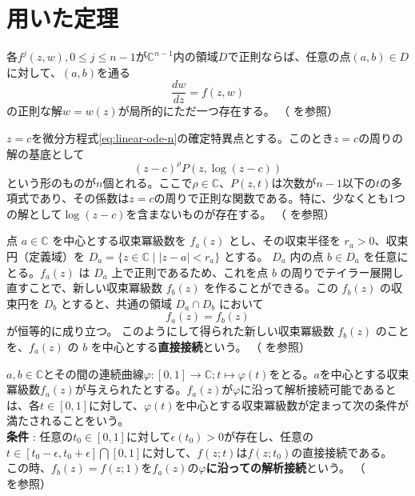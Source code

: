 
\section{用いた定理}%
\begin{theorem}[正則な解の存在と一意性]\label{thm:cauchy}
    各$f^{j}(z,w),0\leq j\leq n-1$が$\mathbb{C}^{n-1}$内の領域$D$で正則ならば、任意の点$(a,b)\in D$に対して、$(a,b)$を通る
    \begin{equation}\label{eq:cauchy_problem}
    \frac{dw}{dz}=f(z,w)
    \end{equation}
    の正則な解$w=w(z)$が局所的にただ一つ存在する。
    （\cite[p.50 定理8.1]{book:takano} を参照）
\end{theorem}
\begin{theorem}\label{thm:fuchs}
    $z=c$を微分方程式\eqref{eq:linear-ode-n}の確定特異点とする。このとき$z=c$の周りの解の基底として
    \[
    (z-c)^{\rho}P(z,\log(z-c))
    \]
    という形のものが$n$個とれる。ここで$\rho\in \mathbb{C}$、$P(z,t)$は次数が$n-1$以下の$t$の多項式であり、その係数は$z=c$の周りで正則な関数である。特に、少なくとも1つの解として$\log(z-c)$を含まないものが存在する。
    （\cite[p.119 定理13.1]{book:takano} を参照）
\end{theorem}
\begin{definition}[直接接続]
    点 $a \in \mathbb{C}$ を中心とする収束冪級数を $f_a(z)$ とし、その収束半径を $r_a > 0$、収束円（定義域）を $D_a = \{z \in \mathbb{C} \mid |z - a| < r_a\}$ とする。
    $D_a$ 内の点 $b \in D_a$ を任意にとる。$f_a(z)$ は $D_a$ 上で正則であるため、これを点 $b$ の周りでテイラー展開し直すことで、新しい収束冪級数 $f_b(z)$ を作ることができる。この $f_b(z)$ の収束円を $D_b$ とすると、共通の領域 $D_a \cap D_b$ において
    \[
    f_a(z) = f_b(z)
    \]
    が恒等的に成り立つ。
    このようにして得られた新しい収束冪級数 $f_b(z)$ のことを、$f_a(z)$ の $b$ を中心とする\textbf{直接接続}という。
    （\cite[p.101]{book:kimura} を参照）
\end{definition}
\begin{definition}[曲線に沿っての解析接続]
    $a,b\in\mathbb{C}$とその間の連続曲線$\varphi:[0,1]\to\mathbb{C};t\mapsto \varphi(t)$をとる。$a$を中心とする収束冪級数$f_{a}(z)$が与えられたとする。$f_{a}(z)$が$\varphi$に沿って解析接続可能であるとは、各$t\in[0,1]$に対して、$\varphi(t)$を中心とする収束冪級数が定まって次の条件が満たされることをいう。\\
    \textbf{条件} : 任意の$t_{0}\in[0,1]$に対して$\epsilon(t_{0})>0$が存在し、任意の$t\in[t_{0}-\epsilon,t_{0}+\epsilon]\bigcap[0,1]$に対して、$f(z;t)$は$f(z;t_{0})$の直接接続である。\\
    この時、$f_{b}(z)=f(z;1)$を$f_{a}(z)$の\textbf{$\varphi$に沿っての解析接続}という。
    （\cite[p.119 定義21.1]{book:kimura} を参照）
\end{definition}
